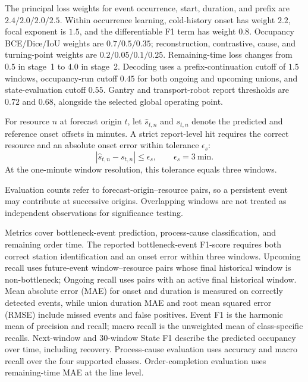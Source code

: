 The principal loss weights for event occurrence, start, duration, and prefix are $2.4/2.0/2.0/2.5$. Within occurrence learning, cold-history onset has weight $2.2$, focal exponent is $1.5$, and the differentiable F1 term has weight $0.8$. Occupancy BCE/Dice/IoU weights are $0.7/0.5/0.35$; reconstruction, contrastive, cause, and turning-point weights are $0.2/0.05/0.1/0.25$. Remaining-time loss changes from $0.5$ in stage~1 to $4.0$ in stage~2. Decoding uses a prefix-continuation cutoff of $1.5$ windows, occupancy-run cutoff $0.45$ for both ongoing and upcoming unions, and state-evaluation cutoff $0.55$. Gantry and transport-robot report thresholds are $0.72$ and $0.68$, alongside the selected global operating point.

For resource $n$ at forecast origin $t$, let $\hat s_{t,n}$ and $s_{t,n}$ denote the predicted and reference onset offsets in minutes. A strict report-level hit requires the correct resource and an absolute onset error within tolerance $\epsilon_s$:
\begin{equation}
|\hat{s}_{t,n}-s_{t,n}|\leq\epsilon_s,\qquad
\epsilon_s=3~\mathrm{min}.
\end{equation}
At the one-minute window resolution, this tolerance equals three windows.

Evaluation counts refer to forecast-origin--resource pairs, so a persistent event may contribute at successive origins. Overlapping windows are not treated as independent observations for significance testing.

Metrics cover bottleneck-event prediction, process-cause classification, and remaining order time. The reported bottleneck-event F1-score requires both correct station identification and an onset error within three windows. Upcoming recall uses future-event window--resource pairs whose final historical window is non-bottleneck; Ongoing recall uses pairs with an active final historical window. Mean absolute error (MAE) for onset and duration is measured on correctly detected events, while union duration MAE and root mean squared error (RMSE) include missed events and false positives. Event F1 is the harmonic mean of precision and recall; macro recall is the unweighted mean of class-specific recalls. Next-window and 30-window State F1 describe the predicted occupancy over time, including recovery. Process-cause evaluation uses accuracy and macro recall over the four supported classes. Order-completion evaluation uses remaining-time MAE at the line level.

